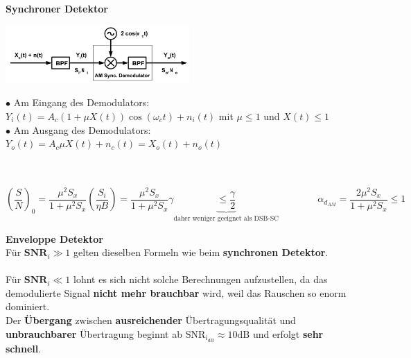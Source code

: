 \textbf{Synchroner Detektor}\\
\begin{minipage}{7.5cm}
	\includegraphics[width = 7cm]{./bilder/08_Sync_Detektor_AM}
\end{minipage}
\begin{minipage}{11cm}
  $\bullet$ Am Eingang des Demodulators:\\ 
  \hspace*{0.3cm}$Y_i(t) = A_c(1 + \mu X(t)) \cos (\omega_c t) + n_i(t)$ \qquad mit $\mu \leq 1$ und $X(t) \leq 1$\\
  $\bullet$ Am Ausgang des Demodulators:\\ 
  \hspace*{0.3cm} $Y_o(t) = A_c\mu X(t) + n_c(t) = X_o(t) + n_o(t)$
\end{minipage}\\ \\

$$ \left(\dfrac{S}{N}\right)_0 =
\dfrac{\mu^2 S_x}{1 + \mu^2 S_x} \left(\dfrac{S_i}{\eta B}\right) = \dfrac{\mu^2 S_x}{1 + \mu^2
S_x} \gamma \underbrace{\leq \dfrac{\gamma}{2}}_{\text{daher weniger geeignet als DSB-SC}} \qquad \qquad
\alpha_{d_{AM}} = \dfrac{2 \mu^2 S_x}{1 + \mu^2 S_x} \leq 1$$


\textbf{Enveloppe Detektor} \\
Für \boldmath$ \textbf{SNR}_i \gg 1 $ gelten dieselben Formeln wie beim \textbf{synchronen
Detektor}. \\ \\ Für \boldmath$ \textbf{SNR}_i \ll 1 $ lohnt es sich nicht solche
Berechnungen aufzustellen, da das demodulierte Signal \textbf{nicht mehr brauchbar} wird, weil das Rauschen so enorm dominiert. \\
Der \textbf{Übergang} zwischen \textbf{ausreichender} Übertragungsqualität und \textbf{unbrauchbarer}  
Übertragung beginnt ab \unboldmath$ \text{SNR}_{i_{dB}} \approx 10 \text{dB} $ und erfolgt
\textbf{sehr schnell}.

